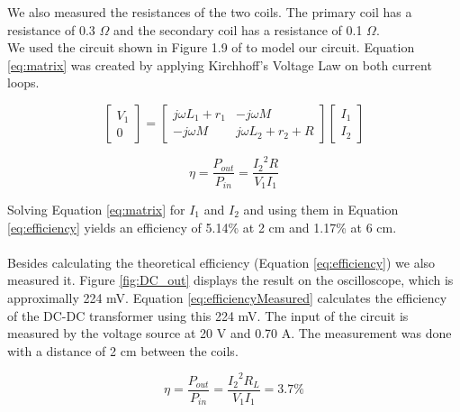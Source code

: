\documentclass[final]{scrreprt} %
\begin{document}
We also measured the resistances of the two coils. The primary coil has a resistance of 0.3 $\Omega$ and the secondary coil has a resistance of 0.1 $\Omega$.
\\
We used the circuit shown in Figure 1.9 of \cite{epo4-manual} to model our circuit. Equation \ref{eq:matrix} was created by applying Kirchhoff's Voltage Law on both current loops.

\begin{equation}
	\begin{bmatrix}
		V_1 \\
		0
	\end{bmatrix} =
	\begin{bmatrix}
		j \omega L_1 + r_1 & -j \omega M \\
		-j \omega M & j \omega L_2 + r_2 + R
	\end{bmatrix}
	\begin{bmatrix}
		I_1 \\
		I_2
	\end{bmatrix}
	\label{eq:matrix}
\end{equation}

\begin{equation}
	\eta = \frac{P_{out}}{P_{in}} = \frac{{I_2}^2 R}{V_1 I_1}
	\label{eq:efficiency}
\end{equation}

Solving Equation \ref{eq:matrix} for $I_1$ and $I_2$ and using them in Equation \ref{eq:efficiency} yields an efficiency of 5.14\% at 2 cm and 1.17\% at 6 cm.
\\ \\
Besides calculating the theoretical efficiency (Equation \ref{eq:efficiency}) we also measured it. Figure \ref{fig:DC_out} displays the result on the oscilloscope, which is approximally 224 mV. Equation \ref{eq:efficiencyMeasured} calculates the efficiency of the DC-DC transformer using this 224 mV. The input of the circuit is measured by the voltage source at 20 V and 0.70 A. The measurement was done with a distance of 2 cm between the coils.

\begin{equation}
	\eta = \frac{P_{out}}{P_{in}} = \frac{{I_2}^2 R_L}{V_1 I_1} = 3.7\%
	\label{eq:efficiencyMeasured}
\end{equation}
\end{document}
